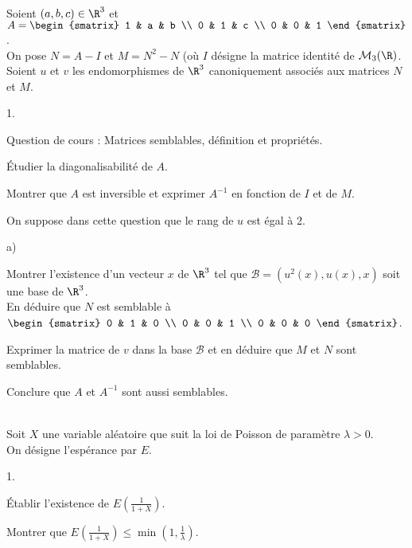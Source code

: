 \documentclass[11pt]{article}%
\begin{document}


\begin{exerciceAP}~\\
  Soient $(a,b,c) \in \R^3$ et $A = 
  \begin{smatrix} 
    1 & a & b \\ 
    0 & 1 & c \\ 
    0 & 0 & 1 
  \end{smatrix}$.\\
  On pose $N = A- I$ et $M = N^2 - N$ (où $I$ désigne la matrice
  identité de $\mathcal{M}_3(\R)$.
  \\[.2cm]
  Soient $u$ et $v$ les endomorphismes de $\R^3$ canoniquement
  associés aux matrices $N$ et $M$.
  \begin{noliste}{1.}
    \setlength{\itemsep}{2mm}
  \item Question de cours : Matrices semblables, définition et propriétés.
  \item Étudier la diagonalisabilité de $A$.
  \item Montrer que $A$ est inversible et exprimer $A^{-1}$ en
    fonction de $I$ et de $M$.
  \item On suppose dans cette question que le rang de $u$ est égal à 2. 
    \begin{noliste}{a)}
    \setlength{\itemsep}{2mm}
    \item Montrer l'existence d'un vecteur $x$ de $\R^3$ tel que
      $\mathcal{B} = (u^2(x),u(x),x)$ soit une base de $\R^3$.
      \\[.2cm]
      En déduire que $N$ est semblable à $
      \begin{smatrix}
        0 & 1 & 0 \\ 
        0 & 0 & 1 \\ 
        0 & 0 & 0 
      \end{smatrix}$.
    \item Exprimer la matrice de $v$ dans la base $\mathcal{B}$ et en
      déduire que $M$ et $N$ sont semblables.
    \item Conclure que $A$ et $A^{-1}$ sont aussi semblables.
    \end{noliste}
  \end{noliste}
\end{exerciceAP}


\begin{exerciceSP}~\\
  Soit $X$ une variable aléatoire que suit la loi de Poisson de
  paramètre $\lambda > 0$. \\
  On désigne l'espérance par $E$.
  \begin{noliste}{1.}
    \setlength{\itemsep}{2mm}
  \item Établir l'existence de $E \left( \frac{1}{1+X} \right)$.
  \item Montrer que $E \left( \frac{1}{1+X} \right) \leq \min \left( 1
      , \frac{1}{\lambda} \right)$.
  \end{noliste}
\end{exerciceSP}
\end{document}
